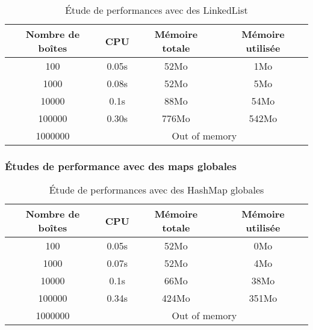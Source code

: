 \begin{table}[htbp]
  \centering
\begin{tabular}{|c|c|c|c|}
\hline
Nombre de boîtes & CPU & Mémoire totale & Mémoire utilisée\\
\hline
100 & 0.05s & 52Mo & 1Mo\\
\hline
1000 & 0.08s & 52Mo & 5Mo\\
\hline
10000 & 0.1s & 88Mo & 54Mo\\
\hline
100000 & 0.30s & 776Mo & 542Mo\\
\hline
1000000 & \multicolumn{3}{|c|}{Out of memory}\\
\hline
\end{tabular}
\caption{Étude de performances avec des LinkedList}
\label{tab:linkedlist}
\end{table}
\clearpage




\subsubsection{Études de performance avec des maps globales}
\begin{table}[h]
  \centering
\begin{tabular}{|c|c|c|c|}
\hline
Nombre de boîtes & CPU & Mémoire totale & Mémoire utilisée\\
\hline
100 & 0.05s & 52Mo & 0Mo\\
\hline
1000 & 0.07s & 52Mo & 4Mo\\
\hline
10000 & 0.1s & 66Mo & 38Mo\\
\hline
100000 & 0.34s & 424Mo & 351Mo\\
\hline
1000000 & \multicolumn{3}{|c|}{Out of memory}\\
\hline
\end{tabular}
\caption{Étude de performances avec des HashMap globales} 
\label{tab:hashmapglobal}
\end{table}











